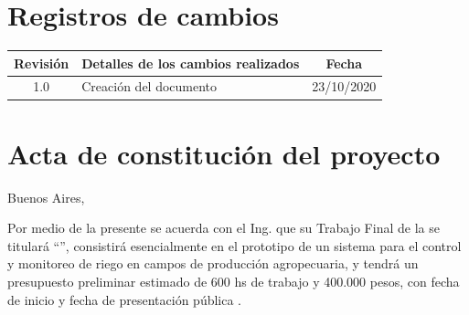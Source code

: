 \documentclass[11pt]{charter}
\begin{document}
\maketitle
\thispagestyle{empty}
\pagebreak


\thispagestyle{empty}
{\setlength{\parskip}{0pt}
\tableofcontents{}
}
\pagebreak


\section{Registros de cambios}
\label{sec:registro}


\begin{table}[ht]
\label{tab:registro}
\centering
\begin{tabularx}{\linewidth}{@{}|c|X|c|@{}}
\hline
\rowcolor[HTML]{C0C0C0} 
Revisión & \multicolumn{1}{c|}{\cellcolor[HTML]{C0C0C0}Detalles de los cambios realizados} & Fecha      \\ \hline
1.0      & Creación del documento                                          & 23/10/2020 \\ \hline
\end{tabularx}
\end{table}

\pagebreak



\section{Acta de constitución del proyecto}
\label{sec:acta}

\begin{flushright}
Buenos Aires, \fechaInicioName
\end{flushright}

\vspace{2cm}

Por medio de la presente se acuerda con el Ing. \authorname\hspace{1px} que su Trabajo Final de la \degreename\hspace{1px} se titulará ``\ttitle'', consistirá esencialmente en el prototipo de un sistema para el control y monitoreo de riego en campos de producción agropecuaria, y tendrá un presupuesto preliminar estimado de 600 hs de trabajo y 400.000 pesos, con fecha de inicio \fechaInicioName\hspace{1px} y fecha de presentación pública \fechaFinalName.
\end{document}
